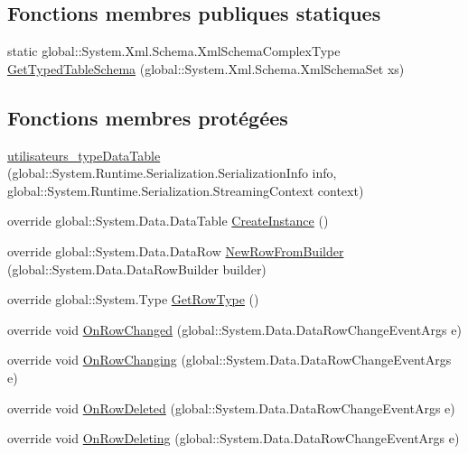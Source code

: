 \subsection*{Fonctions membres publiques statiques}
\begin{DoxyCompactItemize}
\item 
static global\+::\+System.\+Xml.\+Schema.\+Xml\+Schema\+Complex\+Type \hyperlink{classforma_1_1formadb_data_set_1_1utilisateurs__type_data_table_a94216fb4fa08ad163d5465394ecbb5c8}{Get\+Typed\+Table\+Schema} (global\+::\+System.\+Xml.\+Schema.\+Xml\+Schema\+Set xs)
\end{DoxyCompactItemize}
\subsection*{Fonctions membres protégées}
\begin{DoxyCompactItemize}
\item 
\hyperlink{classforma_1_1formadb_data_set_1_1utilisateurs__type_data_table_a615c2c76e4d2a0e04994dc76d1dee416}{utilisateurs\+\_\+type\+Data\+Table} (global\+::\+System.\+Runtime.\+Serialization.\+Serialization\+Info info, global\+::\+System.\+Runtime.\+Serialization.\+Streaming\+Context context)
\item 
override global\+::\+System.\+Data.\+Data\+Table \hyperlink{classforma_1_1formadb_data_set_1_1utilisateurs__type_data_table_a62367dd4d5131603e03864ae0ec3e453}{Create\+Instance} ()
\item 
override global\+::\+System.\+Data.\+Data\+Row \hyperlink{classforma_1_1formadb_data_set_1_1utilisateurs__type_data_table_a4241e5ed324be893f328df61eb3828a2}{New\+Row\+From\+Builder} (global\+::\+System.\+Data.\+Data\+Row\+Builder builder)
\item 
override global\+::\+System.\+Type \hyperlink{classforma_1_1formadb_data_set_1_1utilisateurs__type_data_table_aeb2205cefb783ae064fda6623fdac612}{Get\+Row\+Type} ()
\item 
override void \hyperlink{classforma_1_1formadb_data_set_1_1utilisateurs__type_data_table_a7bac32c46143527f9d6f9e7a4d2cefe3}{On\+Row\+Changed} (global\+::\+System.\+Data.\+Data\+Row\+Change\+Event\+Args e)
\item 
override void \hyperlink{classforma_1_1formadb_data_set_1_1utilisateurs__type_data_table_ab4eb89656675834e60ba755854bbc3e3}{On\+Row\+Changing} (global\+::\+System.\+Data.\+Data\+Row\+Change\+Event\+Args e)
\item 
override void \hyperlink{classforma_1_1formadb_data_set_1_1utilisateurs__type_data_table_adf59882843f83199dddfcae2997895ef}{On\+Row\+Deleted} (global\+::\+System.\+Data.\+Data\+Row\+Change\+Event\+Args e)
\item 
override void \hyperlink{classforma_1_1formadb_data_set_1_1utilisateurs__type_data_table_a014eda15aa99819a4432f6bf873fec61}{On\+Row\+Deleting} (global\+::\+System.\+Data.\+Data\+Row\+Change\+Event\+Args e)
\end{DoxyCompactItemize}
